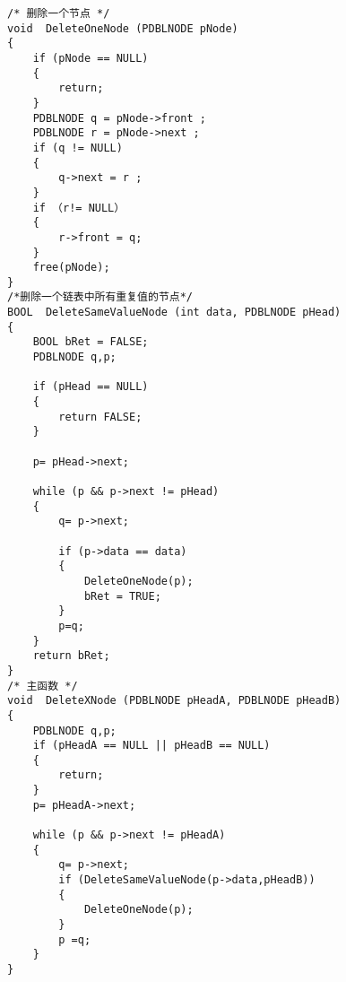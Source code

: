 ﻿\documentclass  [11pt,onecolumn,a4paper]{article}
\begin{document}
\begin{lstlisting}
/* 删除一个节点 */
void  DeleteOneNode (PDBLNODE pNode)
{
    if (pNode == NULL)
    {
        return;
    }
    PDBLNODE q = pNode->front ;
    PDBLNODE r = pNode->next ; 
    if (q != NULL)
    {
        q->next = r ;
    }  
    if （r!= NULL）
    {
        r->front = q;
    }
    free(pNode);    
}
/*删除一个链表中所有重复值的节点*/
BOOL  DeleteSameValueNode (int data, PDBLNODE pHead)
{
    BOOL bRet = FALSE;
    PDBLNODE q,p;

    if (pHead == NULL)
    {
        return FALSE;
    }

    p= pHead->next;

    while (p && p->next != pHead)
    {
        q= p->next;
          
        if (p->data == data)
        {
            DeleteOneNode(p);
            bRet = TRUE; 
        }
        p=q;
    }
    return bRet; 
}
/* 主函数 */
void  DeleteXNode (PDBLNODE pHeadA, PDBLNODE pHeadB)
{
    PDBLNODE q,p;
    if (pHeadA == NULL || pHeadB == NULL)
    {
        return;
    }
    p= pHeadA->next;

    while (p && p->next != pHeadA)
    {
        q= p->next;
        if (DeleteSameValueNode(p->data,pHeadB))
        {
            DeleteOneNode(p);    
        }     
        p =q;
    }
}
\end{lstlisting}
\end{document}
